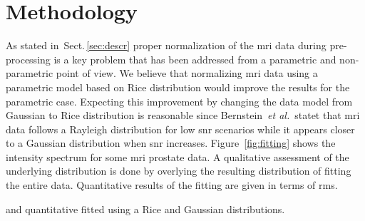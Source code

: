 \section{Methodology}
\label{sec:method}
\graphicspath{ {./content/method/figures/} }


As stated in~Sect.\,\ref{sec:descr} proper normalization of the \ac{mri} data during pre-processing is a key problem that has been addressed from a parametric and non-parametric point of view.
We believe that normalizing \ac{mri} data using a parametric model based on Rice distribution would improve the results for the parametric case.
Expecting this improvement by changing the data model from Gaussian to Rice distribution is reasonable since Bernstein~\emph{et al.}\,\cite{bernstein1989improved} statet that \ac{mri} data follows a Rayleigh distribution for low \ac{snr} scenarios while it appears closer to a Gaussian distribution when \ac{snr} increases.
Figure~\ref{fig:fitting} shows the intensity spectrum for some \ac{mri} prostate data.
A qualitative assessment of the underlying distribution is done by overlying the resulting distribution of fitting the entire data.
Quantitative results of the fitting are given in terms of \ac{rms}.


and quantitative fitted using a Rice and Gaussian distributions.

